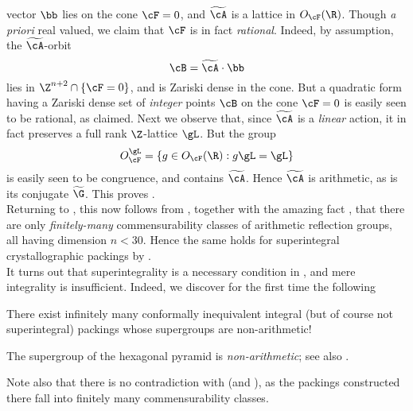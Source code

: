 \documentclass[12pt,reqno]{amsart}
\begin{document}
vector $\bb$ lies on the  cone $\cF=0$, and $\widetilde\cA$ is a lattice in $O_\cF(\R)$.
Though {\it a priori} real valued, we claim that $\cF$ is in fact  {\it rational}.
Indeed, by assumption, the $\widetilde\cA$-orbit 
$$
\cB=\widetilde\cA\cdot\bb
$$
 lies in $\Z^{n+2}\cap \{\cF=0\}$,
and is Zariski dense in the cone. 
 But a quadratic form having a Zariski dense set of {\it integer} points $\cB$ on the cone $\cF=0$ is easily seen to be rational, as claimed. Next we observe that, since $\widetilde\cA$ is a {\it linear} action, it in fact preserves a full rank $\Z$-lattice $\gL$. But the group 
 $$
 O_\cF^\gL=\{g\in O_\cF(\R):g\gL=\gL\}
 $$ 
 is easily seen to be congruence, and contains $\widetilde\cA$. Hence $\widetilde\cA$ is arithmetic, as is its conjugate $\widetilde\G$. This proves .
\\


Returning to  , this now follows from , together with the amazing fact 
\cite{Vinberg1981, LongMaclachlanReid2006, Agol2006, ABSW2008, Nikulin2007}, %
that
there are only {\it finitely-many} %
commensurability classes of
arithmetic reflection groups, all having dimension $n< 30$. Hence the same holds for superintegral crystallographic packings
by .
\\

It turns out that superintegrality is a necessary condition in , and mere integrality is insufficient. Indeed, we discover for the first time the following
\begin{lem}\label{lem:23}
There exist infinitely many conformally inequivalent integral (but of course not superintegral) packings whose supergroups are non-arithmetic!
\end{lem}
\begin{rmk}\label{rmk:nonArith}
The supergroup of the hexagonal pyramid is {\it non-arithmetic};
see also .
\end{rmk}

\begin{rmk}
 Note also that there is no contradiction with  (and ), as the %
 packings
 constructed there %
 fall
 into finitely many commensurability classes.
\end{rmk}
\end{document}
